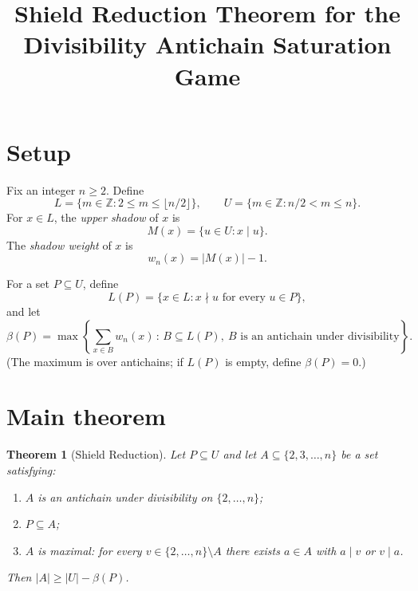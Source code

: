 \documentclass{article}
\title{Shield Reduction Theorem for the Divisibility Antichain Saturation Game}
\author{}
\date{}
\newtheorem{theorem}{Theorem}
\begin{document}
\maketitle

\section{Setup}

Fix an integer $n \ge 2$. Define
\[L = \{m \in \mathbb{Z} : 2 \le m \le \lfloor n/2 \rfloor\}, \qquad U = \{m \in \mathbb{Z} : n/2 < m \le n\}.\]
For $x \in L$, the \emph{upper shadow} of $x$ is
\[M(x) = \{u \in U : x \mid u\}.\]
The \emph{shadow weight} of $x$ is
\[w_n(x) = |M(x)| - 1.\]

For a set $P \subseteq U$, define
\[L(P) = \{x \in L : x \nmid u \text{ for every } u \in P\},\]
and let
\[\beta(P) = \max\left\{\sum_{x \in B} w_n(x) \, : \, B \subseteq L(P),\ B \text{ is an antichain under divisibility}\right\}.\]
(The maximum is over antichains; if $L(P)$ is empty, define $\beta(P) = 0$.)

\section{Main theorem}

\begin{theorem}[Shield Reduction]
\label{thm:shield-reduction}
Let $P \subseteq U$ and let $A \subseteq \{2, 3, \ldots, n\}$ be a set satisfying:
\begin{enumerate}[label=\textup{(\roman*)}]
  \item $A$ is an antichain under divisibility on $\{2, \ldots, n\}$;
  \item $P \subseteq A$;
  \item $A$ is maximal: for every $v \in \{2, \ldots, n\} \setminus A$ there exists $a \in A$ with $a \mid v$ or $v \mid a$.
\end{enumerate}
Then $|A| \ge |U| - \beta(P)$.
\end{theorem}
\end{document}
